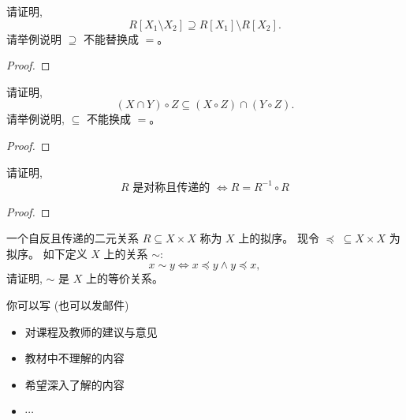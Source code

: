\documentclass[a4paper, justified]{tufte-handout}
\begin{document}
\begin{problem}[关系的运算]
  请证明,
  \[
    R[X_1 \setminus X_2] \supseteq R[X_1] \setminus R[X_2].
  \]
  请举例说明 $\supseteq$ 不能替换成 $=$。
\end{problem}

\begin{proof}
\end{proof}

\begin{problem}[关系的运算]
  请证明,
  \[
    (X \cap Y) \circ Z \subseteq (X \circ Z) \cap (Y \circ Z).
  \]
  请举例说明, $\subseteq$ 不能换成 $=$。
\end{problem}

\begin{proof}
\end{proof}

\begin{problem}[关系的性质]
  请证明,
  \[
    R \text{ 是对称且传递的 } \iff R = R^{-1} \circ R
  \]
\end{problem}

\begin{proof}
\end{proof}

\begin{problem}[等价关系]
  一个自反且传递的二元关系 $R \subseteq X \times X$
  称为 $X$ 上的拟序。
  现令 $\preceq\; \subseteq X \times X$ 为拟序。
  如下定义 $X$ 上的关系 $\sim$:
  \[
    x \sim y \iff x \preceq y \land y \preceq x,
  \]
  请证明, $\sim$ 是 $X$ 上的等价关系。
\end{problem}

\begin{solution}
\end{solution}


\begincorrection

\beginfb

你可以写 (也可以发邮件)
\begin{itemize}
  \item 对课程及教师的建议与意见
  \item 教材中不理解的内容
  \item 希望深入了解的内容
  \item $\cdots$
\end{itemize}
\end{document}
